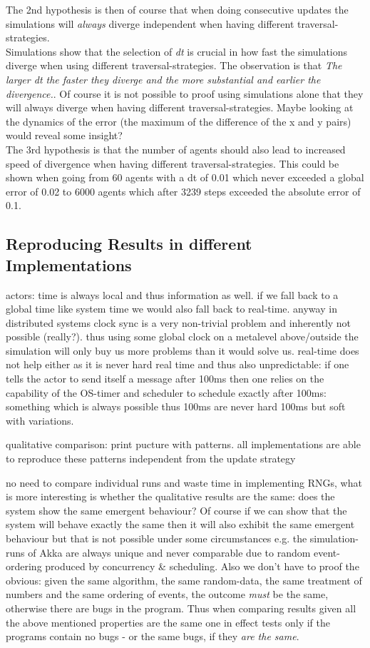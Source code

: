 The 2nd hypothesis is then of course that when doing consecutive updates the simulations will \textit{always} diverge independent when having different traversal-strategies. \\
Simulations show that the selection of \textit{dt} is crucial in how fast the simulations diverge when using different traversal-strategies. The observation is that \textit{The larger dt the faster they diverge and the more substantial and earlier the divergence.}. Of course it is not possible to proof using simulations alone that they will always diverge when having different traversal-strategies. Maybe looking at the dynamics of the error (the maximum of the difference of the x and y pairs) would reveal some insight? \\

The 3rd hypothesis is that the number of agents should also lead to increased speed of divergence when having different traversal-strategies. This could be shown when going from 60 agents with a dt of 0.01 which never exceeded a global error of 0.02 to 6000 agents which after 3239 steps exceeded the absolute error of 0.1.

\subsection{Reproducing Results in different Implementations}
actors: time is always local and thus information as well. if we fall back to a global time like system time we would also fall back to real-time. anyway in distributed systems clock sync is a very non-trivial problem and inherently not possible (really?). thus using some global clock on a metalevel above/outside the simulation will only buy us more problems than it would solve us. real-time does not help either as it is never hard real time and thus also unpredictable: if one tells the actor to send itself a message after 100ms then one relies on the capability of the OS-timer and scheduler to schedule exactly after 100ms: something which is always possible thus 100ms are never hard 100ms but soft with variations.

qualitative comparison: print pucture with patterns. all implementations are able to reproduce these patterns independent from the update strategy

no need to compare individual runs and waste time in implementing RNGs, what is more interesting is whether the qualitative results are the same: does the system show the same emergent behaviour? Of course if we can show that the system will behave exactly the same then it will also exhibit the same emergent behaviour but that is not possible under some circumstances e.g. the simulation-runs of Akka are always unique and never comparable due to random event-ordering produced by concurrency \& scheduling. Also we don't have to proof the obvious: given the same algorithm, the same random-data, the same treatment of numbers and the same ordering of events, the outcome \textit{must} be the same, otherwise there are bugs in the program. Thus when comparing results given all the above mentioned properties are the same one in effect tests only if the programs contain no bugs - or the same bugs, if they \textit{are the same}. \\


